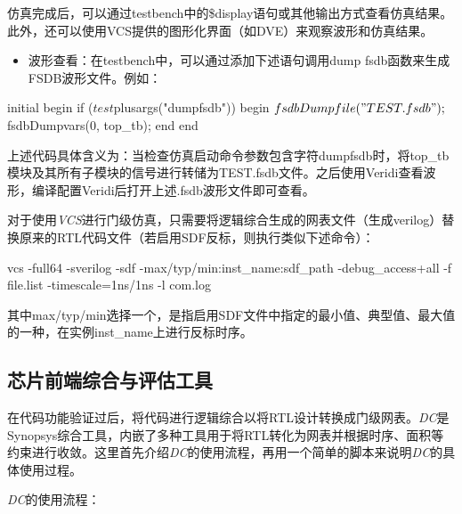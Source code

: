 仿真完成后，可以通过testbench中的\$display语句或其他输出方式查看仿真结果。此外，还可以使用VCS提供的图形化界面（如DVE）来观察波形和仿真结果。

\begin{itemize}
\tightlist
\item
  波形查看：在testbench中，可以通过添加下述语句调用dump
  fsdb函数来生成FSDB波形文件。例如：
\end{itemize}

\begin{CodeBlock}[language=BookVerilog]
initial begin  
  if ($test$plusargs("dumpfsdb")) begin  
    $fsdbDumpfile("TEST.fsdb");  
    $fsdbDumpvars(0, top_tb);  
  end  
end
\end{CodeBlock}

上述代码具体含义为：当检查仿真启动命令参数包含字符dumpfsdb时，将top\_tb模块及其所有子模块的信号进行转储为TEST.fsdb文件。之后使用Veridi查看波形，编译配置Veridi后打开上述.fsdb波形文件即可查看。

对于使用\emph{VCS}进行门级仿真，只需要将逻辑综合生成的网表文件（生成verilog）替换原来的RTL代码文件（若启用SDF反标，则执行类似下述命令）：

\begin{CodeBlock}[language=BookShell]
vcs -full64 -sverilog -sdf -max/typ/min:inst_name:sdf_path -debug_access+all -f 
file.list -timescale=1ns/1ns -l com.log
\end{CodeBlock}

其中max/typ/min选择一个，是指启用SDF文件中指定的最小值、典型值、最大值的一种，在实例inst\_name上进行反标时序。

\subsection{芯片前端综合与评估工具}\label{sec:15-chip-preparation-009}

在代码功能验证过后，将代码进行逻辑综合以将RTL设计转换成门级网表。\emph{DC}是Synopsys综合工具，内嵌了多种工具用于将RTL转化为网表并根据时序、面积等约束进行收敛。这里首先介绍\emph{DC}的使用流程，再用一个简单的脚本来说明\emph{DC}的具体使用过程。

\emph{DC}的使用流程：

